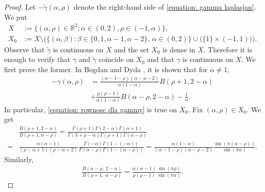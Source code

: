 \documentclass[12pt, a4paper]{amsart}
\newcommand{\R}{\mathbb{R}}
\begin{document}
\begin{proof} Let $-\widetilde{\gamma}(\alpha, \rho)$ denote the right-hand side of \cref{equation: gamma laplasjan}. We put
\begin{align*}
    X &:= \{ (\alpha, \rho) \in \R^2 : \alpha \in (0, 2), \rho \in (-1, \alpha)\},
    \\
    X_0 &:= X \setminus
    \bigg( \{(\alpha,\beta) : \beta \in \{0,1,\alpha-1,\alpha-2\},\, \alpha\in(0,2) \} \cup \Big( \{1\}\times (-1,1) \Big) \bigg).
\end{align*}
Observe that $\widetilde{\gamma}$ is continuous on $X$ and the set $X_0$ is dense in $X$. Therefore it is enough to verify that  $\gamma$ and $ \widetilde{\gamma}$ coincide on $X_0$ and that $\gamma$ is continuous on $X$. We first prove the former. In Bogdan and Dyda \cite[(2.2)]{2011-KB-BD-mn}, it is shown that for $\alpha \neq 1$,
\begin{align}
\label{equation: rownosc dla gammy}
-\gamma(\alpha, \rho) &= \frac{\left(\alpha-1-\rho\right)\left(\alpha-\rho-2\right)}{\alpha\left(1-\alpha\right)}B\left(\rho+1, 2-\alpha\right)\\
&+\frac{\rho\left(\rho-1\right)}{\alpha\left(1-\alpha\right)}B\left(\alpha-\rho, 2-\alpha\right)-\frac{1}{\alpha}.
\nonumber
\end{align}
In particular, \cref{equation: rownosc dla gammy} is true on $X_0$. Fix $(\alpha, \rho) \in X_0$. We get
\begin{align*}
    &\frac{B\left(\rho+1,2-\alpha\right)}{B\left(\rho+1,\alpha-\rho\right)} = \frac{\Gamma\left(\rho+1\right)\Gamma\left(2-\alpha\right)\Gamma\left(\alpha+1\right)}{\Gamma\left(3+\rho-\alpha\right)\Gamma\left(\rho+1\right)\Gamma\left(\alpha-\rho\right)} 
    \\
    = &\frac{\alpha\left(\alpha-1\right)}{\left(\rho-\alpha+1\right)\left(\rho-\alpha+2\right)}\frac{\Gamma\left(-\alpha\right)\Gamma\left(1-\left(-\alpha\right)\right)}{\Gamma\left(\alpha-\rho\right)\Gamma\left(1-\left(\alpha-\rho\right)\right)} = \frac{\alpha\left(1-\alpha\right)}{\left(\alpha-1-\rho\right)\left(\alpha-\rho-2\right)}\frac{\sin\left(\pi\left(\alpha-\rho\right)\right)}{\sin\left(\pi\alpha\right)}.
\end{align*}
Similarly,
\begin{align*}
    \frac{B\left(\alpha-\rho,\ 2-\alpha\right)}{B\left(\rho+1,\ \alpha-\rho\right)} = \frac{\alpha\left(\alpha-1\right)}{\rho\left(\rho-1\right)}\frac{\sin\left(\pi \rho\right)}{\sin\left(\pi\alpha\right)}.

\end{align*}
\end{proof}
\end{document}
